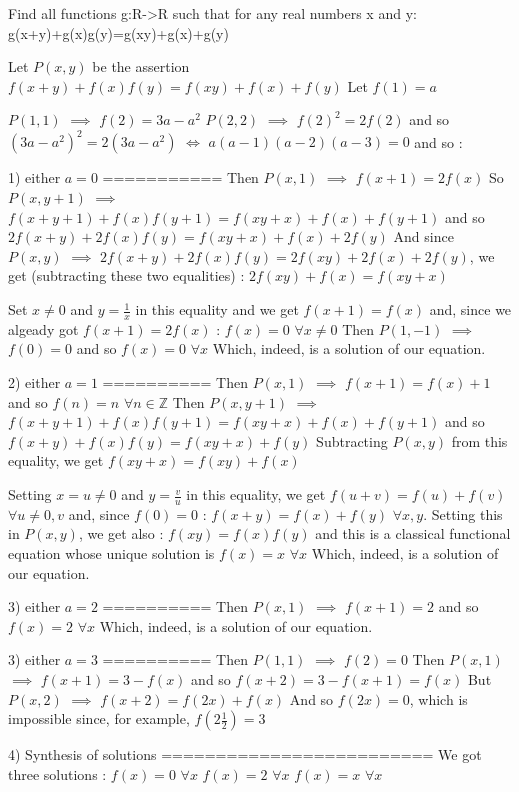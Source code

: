 \begin{solution}
	\begin{tcolorbox}Find all functions g:R->R such that for any real numbers x and y:
g(x+y)+g(x)g(y)=g(xy)+g(x)+g(y)\end{tcolorbox}
Let $ P(x,y)$ be the assertion $ f(x+y)+f(x)f(y)=f(xy)+f(x)+f(y)$
Let $ f(1)=a$

$ P(1,1)$ $ \implies$ $ f(2)=3a-a^2$
$ P(2,2)$ $ \implies$ $ f(2)^2=2f(2)$ and so $ (3a-a^2)^2=2(3a-a^2)$ $ \iff$ $ a(a-1)(a-2)(a-3)=0$ and so :

1) either $ a=0$
===========
Then $ P(x,1)$ $ \implies$ $ f(x+1)=2f(x)$
So $ P(x,y+1)$ $ \implies$ $ f(x+y+1)+f(x)f(y+1)=f(xy+x)+f(x)+f(y+1)$ and so $ 2f(x+y)+2f(x)f(y)=f(xy+x)+f(x)+2f(y)$
And since $ P(x,y)$ $ \implies$ $ 2f(x+y)+2f(x)f(y)=2f(xy)+2f(x)+2f(y)$, we get (subtracting these two equalities) :
$ 2f(xy)+f(x)=f(xy+x)$

Set $ x\ne 0$ and $ y=\frac 1x$ in this equality and we get $ f(x+1)=f(x)$ and, since we algeady got $ f(x+1)=2f(x)$ :
$ f(x)=0$ $ \forall x\ne 0$
Then $ P(1,-1)$ $ \implies$ $ f(0)=0$ and so $ f(x)=0$ $ \forall x$
Which, indeed, is a solution of our equation.


2) either $ a=1$
==========
Then  $ P(x,1)$ $ \implies$ $ f(x+1)=f(x)+1$ and so $ f(n)=n$ $ \forall n\in\mathbb Z$
Then $ P(x,y+1)$ $ \implies$  $ f(x+y+1)+f(x)f(y+1)=f(xy+x)+f(x)+f(y+1)$ and so $ f(x+y)+f(x)f(y)=f(xy+x)+f(y)$
Subtracting $ P(x,y)$ from this equality, we get $ f(xy+x)=f(xy)+f(x)$

Setting $ x=u\ne 0$ and $ y=\frac vu$ in this equality, we get $ f(u+v)=f(u)+f(v)$ $ \forall u\ne 0,v$ and, since $ f(0)=0$ :
$ f(x+y)=f(x)+f(y)$ $ \forall x,y$. Setting this in $ P(x,y)$, we get also :
$ f(xy)=f(x)f(y)$ 
and this is a classical functional equation whose unique solution is $ f(x)=x$ $ \forall x$
Which, indeed, is a solution of our equation.

3) either $ a=2$
==========
Then  $ P(x,1)$ $ \implies$ $ f(x+1)=2$ and so $ f(x)=2$ $ \forall x$
Which, indeed, is a solution of our equation.

3) either $ a=3$
==========
Then $ P(1,1)$ $ \implies$ $ f(2)=0$
Then $ P(x,1)$ $ \implies$ $ f(x+1)=3-f(x)$ and so $ f(x+2)=3-f(x+1)=f(x)$
But $ P(x,2)$ $ \implies$ $ f(x+2)=f(2x)+f(x)$
And so $ f(2x)=0$, which is impossible since, for example, $ f(2\frac 12)=3$


4) Synthesis of solutions
=========================
We got three solutions :
$ f(x)=0$ $ \forall x$
$ f(x)=2$ $ \forall x$
$ f(x)=x$ $ \forall x$
\end{solution}



